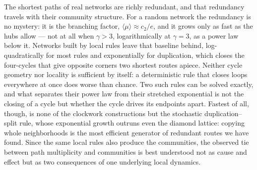 The shortest paths of real networks are richly redundant, and that redundancy
travels with their community structure. For a random network the redundancy is no
mystery: it is the branching factor, $\langle\mu\rangle\approx c_2/e$, and it
grows only as fast as the hubs allow --- not at all when $\gamma>3$,
logarithmically at $\gamma=3$, as a power law below it. Networks built by local
rules leave that baseline behind, log-quadratically for most rules and
exponentially for duplication, which closes the four-cycles that give opposite
corners two shortest routes apiece. Neither cycle geometry nor locality is
sufficient by itself: a deterministic rule that closes loops everywhere at once
does worse than chance. Two such rules can be solved exactly, and what separates
their power law from their stretched exponential is not the closing of a cycle but
whether the cycle drives its endpoints apart. Fastest of all, though, is none of
the clockwork constructions but the stochastic duplication--split rule, whose
exponential growth outruns even the diamond lattice: copying whole neighborhoods
is the most efficient generator of redundant routes we have found. Since the same
local rules also produce the communities, the observed tie between path
multiplicity and communities is best understood not as cause and effect but as two
consequences of one underlying local dynamics.
